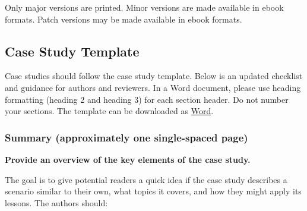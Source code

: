 \documentclass[
]{WileySix}
\begin{document}
Only major versions are printed. Minor versions are made available in ebook formats. Patch versions may be made available in ebook formats.

\hypertarget{case-study-template}{%
\subsection*{Case Study Template}\label{case-study-template}}

Case studies should follow the case study template. Below is an updated checklist and guidance for authors and reviewers. In a Word document, please use heading formatting (heading 2 and heading 3) for each section header. Do not number your sections. The template can be downloaded as \href{assets/contributing/case_study_template.docx}{Word}.

\hypertarget{summary-approximately-one-single-spaced-page}{%
\subsubsection*{Summary (approximately one single-spaced page)}\label{summary-approximately-one-single-spaced-page}}

\textbf{Provide an overview of the key elements of the case study.}

The goal is to give potential readers a quick idea if the case study describes a scenario similar to their own, what topics it covers, and how they might apply its lessons. The authors should:
\end{document}
